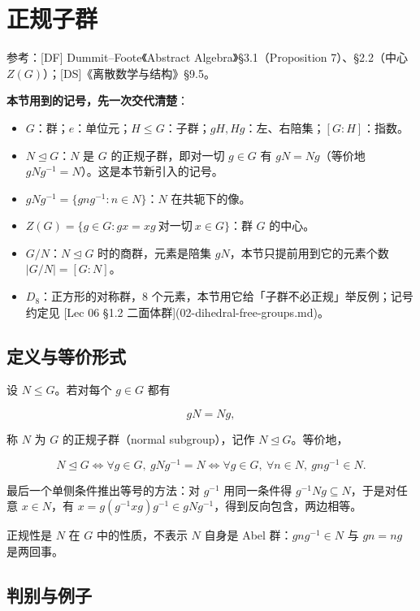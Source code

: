 \section{正规子群}


参考：[DF] Dummit–Foote《Abstract Algebra》§3.1（Proposition 7）、§2.2（中心 $Z(G)$）；[DS]《离散数学与结构》§9.5。

\textbf{本节用到的记号，先一次交代清楚}：

\begin{itemize}
\item $G$：群；$e$：单位元；$H\le G$：子群；$gH,Hg$：左、右陪集；$[G:H]$：指数。
\item $N\trianglelefteq G$：$N$ 是 $G$ 的正规子群，即对一切 $g\in G$ 有 $gN=Ng$（等价地 $gNg^{-1}=N$）。这是本节新引入的记号。
\item $gNg^{-1}=\{gng^{-1}:n\in N\}$：$N$ 在共轭下的像。
\item $Z(G)=\{g\in G:gx=xg\ \text{对一切}\ x\in G\}$：群 $G$ 的中心。
\item $G/N$：$N\trianglelefteq G$ 时的商群，元素是陪集 $gN$，本节只提前用到它的元素个数 $|G/N|=[G:N]$。
\item $D_8$：正方形的对称群，$8$ 个元素，本节用它给「子群不必正规」举反例；记号约定见 [Lec 06 §1.2 二面体群](02-dihedral-free-groups.md)。
\end{itemize}


\subsection{定义与等价形式}


设 $N\le G$。若对每个 $g\in G$ 都有

\[gN=Ng,\]

称 $N$ 为 $G$ 的正规子群（normal subgroup），记作 $N\trianglelefteq G$。等价地，

\[N\trianglelefteq G\iff \forall g\in G,\ gNg^{-1}=N\iff \forall g\in G,\ \forall n\in N,\ gng^{-1}\in N.\]

最后一个单侧条件推出等号的方法：对 $g^{-1}$ 用同一条件得 $g^{-1}Ng\subseteq N$，于是对任意 $x\in N$，有 $x=g(g^{-1}xg)g^{-1}\in gNg^{-1}$，得到反向包含，两边相等。

正规性是 $N$ 在 $G$ 中的性质，不表示 $N$ 自身是 Abel 群：$gng^{-1}\in N$ 与 $gn=ng$ 是两回事。

\subsection{判别与例子}


